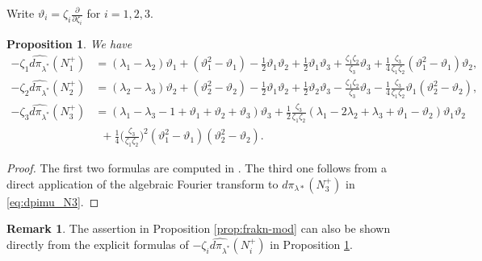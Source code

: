 \documentclass[a4paper,11pt,reqno]{amsart}
\newcommand{\0}{{\bf 0}}
\newcommand{\1}{{\bf 1}}
\theoremstyle{plain}
\newtheorem{proposition}[equation]{Proposition}
\theoremstyle{definition}
\newtheorem{remark}[equation]{Remark}
\numberwithin{equation}{section}
\theoremstyle{definition}
\begin{document}
Write $\vartheta_i=\zeta_i\frac{\partial}{\partial \zeta_i}$ for $i=1,2,3$.

\begin{proposition}
\label{prop:Fdpi}
We have
\begin{align*}
-\zeta_1\widehat{d\pi_{\lambda^*}}(N_1^+) &=(\lambda_1-\lambda_2)\vartheta_1+(\vartheta_1^2-\vartheta_1)-\frac{1}{2}\vartheta_1\vartheta_2+\frac{1}{2}\vartheta_1\vartheta_3+\frac{\zeta_1\zeta_2}{\zeta_3}\vartheta_3+\frac{1}{4}\frac{\zeta_3}{\zeta_1\zeta_2}(\vartheta_1^2-\vartheta_1)\vartheta_2,\\[3pt]
-\zeta_2\widehat{d\pi_{\lambda^*}}(N_2^+)&=(\lambda_2-\lambda_3)\vartheta_2+(\vartheta_2^2-\vartheta_2)-\frac{1}{2}\vartheta_1\vartheta_2+\frac{1}{2}\vartheta_2\vartheta_3-\frac{\zeta_1\zeta_2}{\zeta_3}\vartheta_3-\frac{1}{4}\frac{\zeta_3}{\zeta_1\zeta_2}\vartheta_1(\vartheta_2^2-\vartheta_2),\\[3pt]
-\zeta_3\widehat{d\pi_{\lambda^*}}(N_3^+)&=(\lambda_1-\lambda_3-1+\vartheta_1+\vartheta_2+\vartheta_3)\vartheta_3+\frac{1}{2}\frac{\zeta_3}{\zeta_1\zeta_2}(\lambda_1-2\lambda_2+\lambda_3+\vartheta_1-\vartheta_2)\vartheta_1\vartheta_2\\
&\enspace +\frac{1}{4}\Big(\frac{\zeta_3}{\zeta_1\zeta_2}\Big)^2(\vartheta_1^2-\vartheta_1)(\vartheta_2^2-\vartheta_2).
\end{align*}
\end{proposition}

\begin{proof}
The first two formulas are computed in {\cite[Props.\ 5.11]{KPV25}}.
The third one follows from a direct application of the algebraic Fourier transform
to  $d\pi_{\lambda*}(N_3^+)$ in \eqref{eq:dpimu_N3}.
\end{proof}

\begin{remark}
The assertion in Proposition \ref{prop:frakn-mod} can also be shown  
directly from the explicit formulas of $-\zeta_i\widehat{d\pi_{\lambda^*}}(N_i^+)$
in Proposition \ref{prop:Fdpi}.
\end{remark}
\end{document}
